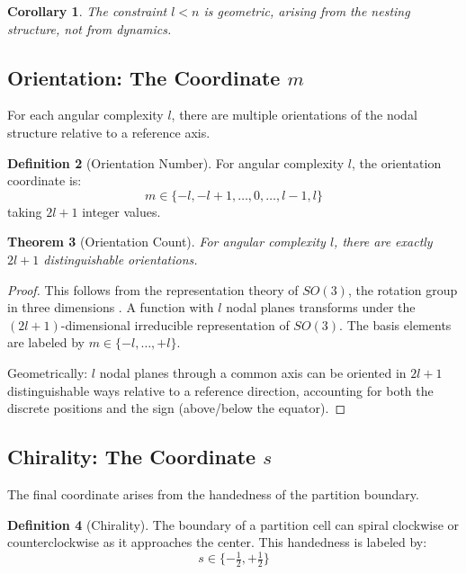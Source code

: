 \documentclass[twocolumn,10pt,a4paper]{article}
\newtheorem{theorem}{Theorem}[section]
\newtheorem{corollary}[theorem]{Corollary}
\theoremstyle{definition}
\newtheorem{definition}[theorem]{Definition}
\theoremstyle{remark}
\begin{document}
\begin{corollary}
The constraint $l < n$ is geometric, arising from the nesting structure, not from dynamics.
\end{corollary}

\subsection{Orientation: The Coordinate $m$}

For each angular complexity $l$, there are multiple orientations of the nodal structure relative to a reference axis.

\begin{definition}[Orientation Number]
For angular complexity $l$, the orientation coordinate is:
\begin{equation}
    m \in \{-l, -l+1, \ldots, 0, \ldots, l-1, l\}
\end{equation}
taking $2l + 1$ integer values.
\end{definition}

\begin{theorem}[Orientation Count]
For angular complexity $l$, there are exactly $2l + 1$ distinguishable orientations.
\end{theorem}

\begin{proof}
This follows from the representation theory of $SO(3)$, the rotation group in three dimensions \cite{wigner1959}. A function with $l$ nodal planes transforms under the $(2l+1)$-dimensional irreducible representation of $SO(3)$. The basis elements are labeled by $m \in \{-l, \ldots, +l\}$.

Geometrically: $l$ nodal planes through a common axis can be oriented in $2l + 1$ distinguishable ways relative to a reference direction, accounting for both the discrete positions and the sign (above/below the equator).
\end{proof}

\subsection{Chirality: The Coordinate $s$}

The final coordinate arises from the handedness of the partition boundary.

\begin{definition}[Chirality]
The boundary of a partition cell can spiral clockwise or counterclockwise as it approaches the center. This handedness is labeled by:
\begin{equation}
    s \in \{-\tfrac{1}{2}, +\tfrac{1}{2}\}
\end{equation}
\end{definition}
\end{document}
